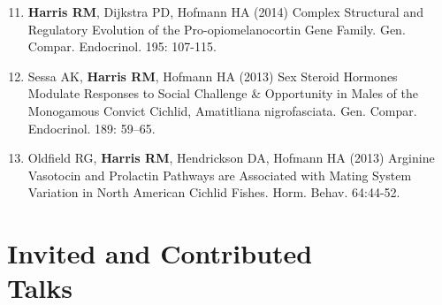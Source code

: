 \documentclass[margin,line]{CV}
\newenvironment{benumerate}[1]{
    \let\oldItem\item
    \def\item{\addtocounter{enumi}{-2}\oldItem}
    \begin{enumerate}
    \setcounter{enumi}{#1}
    \addtocounter{enumi}{1}
}{
    \end{enumerate}
}
\begin{document}
\begin{resume}
\begin{benumerate}{10}
\item {\bf Harris RM}, Dijkstra PD, Hofmann HA (2014) Complex Structural and Regulatory Evolution of the Pro-opiomelanocortin Gene Family. Gen. Compar. Endocrinol. 195: 107-115. 

\item Sessa AK, {\bf Harris RM}, Hofmann HA (2013) Sex Steroid Hormones Modulate Responses to Social Challenge \& Opportunity in Males of the Monogamous Convict Cichlid, Amatitliana nigrofasciata. Gen. Compar. Endocrinol. 189: 59–65. 

\item Oldfield RG, {\bf Harris RM}, Hendrickson DA, Hofmann HA (2013) Arginine Vasotocin and Prolactin Pathways are Associated with Mating System Variation in North American Cichlid Fishes. Horm. Behav. 64:44-52. 
\end{benumerate}





\section{\mysidestyle Invited and Contributed \\ Talks}


\end{resume}
\end{document}
